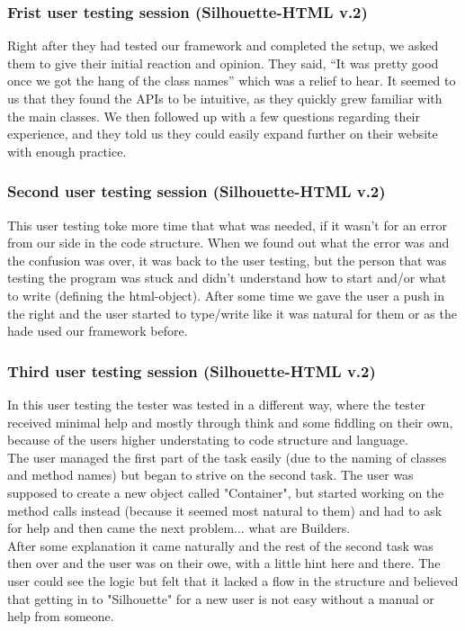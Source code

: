 \documentclass[12pt]{article}
\begin{document}
        \subsubsection{Frist user testing session (Silhouette-HTML v.2)}
        Right after they had tested our framework and completed the setup, we asked them to give their initial reaction and opinion. They said, “It was pretty good once we got the hang of the class names” which was a relief to hear. It seemed to us that they found the APIs to be intuitive, as they quickly grew familiar with the main classes. We then followed up with a few questions regarding their experience, and they told us they could easily expand further on their website with enough practice.

        \subsubsection{Second user testing session (Silhouette-HTML v.2)}
        This user testing toke more time that what was needed, if it wasn’t for an error from our side in the code structure. When we found out what the error was and the confusion was over, it was back to the user testing, but the person that was testing the program was stuck and didn’t understand how to start and/or what to write (defining the html-object). After some time we gave the user a push in the right and the user started to type/write like it was natural for them or as the hade used our framework before.

        \subsubsection{Third user testing session (Silhouette-HTML v.2)}
        In this user testing the tester was tested in a different way, where the tester received minimal help and mostly through think and some fiddling on their own, because of the users higher understating to code structure and language. \\
        The user managed the first part of the task easily (due to the naming of classes and method names) but began to strive on the second task. The user was supposed to create a new object called "Container", but started working on the method calls instead (because it seemed most natural to them) and had to ask for help and then came the next problem... what are Builders.\\
        After some explanation it came naturally and the rest of the second task was then over and the user was on their owe, with a little hint here and there. The user could see the logic but felt that it lacked a flow in the structure and believed that getting in to "Silhouette" for a new user is not easy without a manual or help from someone.
        
\end{document}

